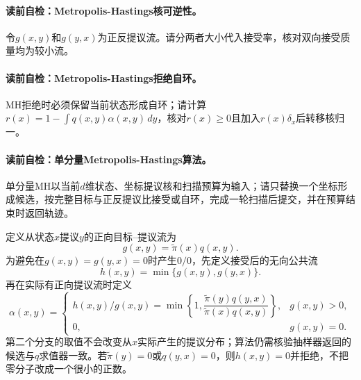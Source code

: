 \paragraph{读前自检：Metropolis-Hastings核可逆性。}令$g(x,y)$和$g(y,x)$为正反提议流。请分两者大小代入接受率，核对双向接受质量均为较小流。\par

\paragraph{读前自检：Metropolis-Hastings拒绝自环。}MH拒绝时必须保留当前状态形成自环；请计算$r(x)=1-\int q(x,y)\alpha(x,y)\,dy$，核对$r(x)\ge0$且加入$r(x)\delta_x$后转移核归一。\par
\paragraph{读前自检：单分量Metropolis-Hastings算法。}单分量MH以当前$d$维状态、坐标提议核和扫描预算为输入；请只替换一个坐标形成候选，按完整目标与正反提议比接受或自环，完成一轮扫描后提交，并在预算结束时返回轨迹。\par


定义从状态$x$提议$y$的正向目标--提议流为
\begin{equation}\label{eq:V5-C03-directed-flow}
g(x,y)=\widetilde\pi(x)q(x,y).
\end{equation}
为避免在$g(x,y)=g(y,x)=0$时产生$0/0$，先定义接受后的无向公共流
\begin{equation}\label{eq:V5-C03-common-flow}
h(x,y)=\min\{g(x,y),g(y,x)\}.
\end{equation}
再在实际有正向提议流时定义
\begin{equation}\label{eq:V5-C03-mh-alpha}
\alpha(x,y)=
\begin{cases}
h(x,y)/g(x,y)
=\min\!\left\{1,
\dfrac{\widetilde\pi(y)q(y,x)}
{\widetilde\pi(x)q(x,y)}\right\},&g(x,y)>0,\\[1.1em]
0,&g(x,y)=0.
\end{cases}
\end{equation}
第二个分支的取值不会改变从$x$实际产生的提议分布；算法仍需核验抽样器返回的候选与$q$求值器一致。若$\widetilde\pi(y)=0$或$q(y,x)=0$，则$h(x,y)=0$并拒绝，不把零分子改成一个很小的正数。

